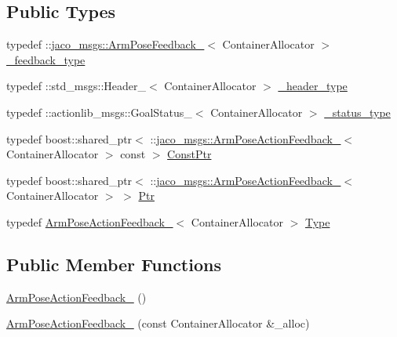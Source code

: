 \subsection*{Public Types}
\begin{DoxyCompactItemize}
\item 
typedef \+::\hyperlink{structjaco__msgs_1_1ArmPoseFeedback__}{jaco\+\_\+msgs\+::\+Arm\+Pose\+Feedback\+\_\+}$<$ Container\+Allocator $>$ \hyperlink{structjaco__msgs_1_1ArmPoseActionFeedback___aeb40aa6cf61cdbbfc66dd06afad5966f}{\+\_\+feedback\+\_\+type}
\item 
typedef \+::std\+\_\+msgs\+::\+Header\+\_\+$<$ Container\+Allocator $>$ \hyperlink{structjaco__msgs_1_1ArmPoseActionFeedback___a69a211a498e91546eee88514ed284ebb}{\+\_\+header\+\_\+type}
\item 
typedef \+::actionlib\+\_\+msgs\+::\+Goal\+Status\+\_\+$<$ Container\+Allocator $>$ \hyperlink{structjaco__msgs_1_1ArmPoseActionFeedback___ad4f8a93bf87c5fd004a8523ca2182c2c}{\+\_\+status\+\_\+type}
\item 
typedef boost\+::shared\+\_\+ptr$<$ \+::\hyperlink{structjaco__msgs_1_1ArmPoseActionFeedback__}{jaco\+\_\+msgs\+::\+Arm\+Pose\+Action\+Feedback\+\_\+}$<$ Container\+Allocator $>$ const  $>$ \hyperlink{structjaco__msgs_1_1ArmPoseActionFeedback___a84666f98ea7faef88c0635f1d3fc3764}{Const\+Ptr}
\item 
typedef boost\+::shared\+\_\+ptr$<$ \+::\hyperlink{structjaco__msgs_1_1ArmPoseActionFeedback__}{jaco\+\_\+msgs\+::\+Arm\+Pose\+Action\+Feedback\+\_\+}$<$ Container\+Allocator $>$ $>$ \hyperlink{structjaco__msgs_1_1ArmPoseActionFeedback___a54f785714afb578d9d16baf67ceabc43}{Ptr}
\item 
typedef \hyperlink{structjaco__msgs_1_1ArmPoseActionFeedback__}{Arm\+Pose\+Action\+Feedback\+\_\+}$<$ Container\+Allocator $>$ \hyperlink{structjaco__msgs_1_1ArmPoseActionFeedback___af499dd5bc5714c5deb46e50cada0b720}{Type}
\end{DoxyCompactItemize}
\subsection*{Public Member Functions}
\begin{DoxyCompactItemize}
\item 
\hyperlink{structjaco__msgs_1_1ArmPoseActionFeedback___a565087450eb093aada989765857ce771}{Arm\+Pose\+Action\+Feedback\+\_\+} ()
\item 
\hyperlink{structjaco__msgs_1_1ArmPoseActionFeedback___a04ec5e5a8bec69d9e85733f2e8f8b334}{Arm\+Pose\+Action\+Feedback\+\_\+} (const Container\+Allocator \&\+\_\+alloc)
\end{DoxyCompactItemize}
